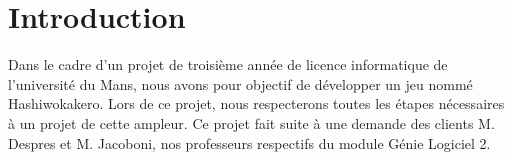\wPt\vspace{-9cm}
\section{Introduction}
Dans le cadre d'un projet de troisième année de licence informatique de l'université du Mans, nous avons pour objectif de développer un jeu nommé Hashiwokakero.
Lors de ce projet, nous respecterons toutes les étapes nécessaires à un projet de cette ampleur.
Ce projet fait suite à une demande des clients M. Despres et M. Jacoboni, nos professeurs respectifs du module Génie Logiciel 2.